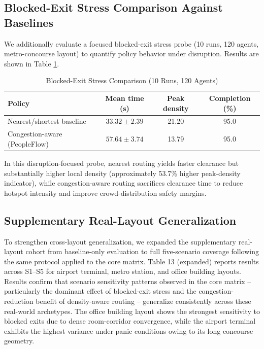 \documentclass[utf8]{FrontiersinHarvard}
\begin{document}
\subsection{Blocked-Exit Stress Comparison Against Baselines}
We additionally evaluate a focused blocked-exit stress probe (10 runs, 120 agents, metro-concourse layout) to quantify policy behavior under disruption. Results are shown in Table \ref{tab:blocked_policy_comparison}.

\begin{table}[!htbp]
\centering
\caption{Blocked-Exit Stress Comparison (10 Runs, 120 Agents)}
\label{tab:blocked_policy_comparison}
{\footnotesize
\setlength{\tabcolsep}{3pt}
\begin{tabular}{>{\raggedright\arraybackslash}p{2.2cm}ccc}
\toprule
\textbf{Policy} & \textbf{Mean time (s)} & \textbf{Peak density} & \textbf{Completion (\%)} \\
\midrule
Nearest/shortest baseline & $33.32 \pm 2.39$ & 21.20 & 95.0 \\
Congestion-aware (PeopleFlow) & $57.64 \pm 3.74$ & 13.79 & 95.0 \\
\bottomrule
\end{tabular}
}
\end{table}

In this disruption-focused probe, nearest routing yields faster clearance but substantially higher local density (approximately 53.7\% higher peak-density indicator), while congestion-aware routing sacrifices clearance time to reduce hotspot intensity and improve crowd-distribution safety margins.

\subsection{Supplementary Real-Layout Generalization}
To strengthen cross-layout generalization, we expanded the supplementary real-layout cohort from baseline-only evaluation to full five-scenario coverage following the same protocol applied to the core matrix. Table 13 (expanded) reports results across S1--S5 for airport terminal, metro station, and office building layouts. Results confirm that scenario sensitivity patterns observed in the core matrix -- particularly the dominant effect of blocked-exit stress and the congestion-reduction benefit of density-aware routing -- generalize consistently across these real-world archetypes. The office building layout shows the strongest sensitivity to blocked exits due to dense room-corridor convergence, while the airport terminal exhibits the highest variance under panic conditions owing to its long concourse geometry.
\end{document}
